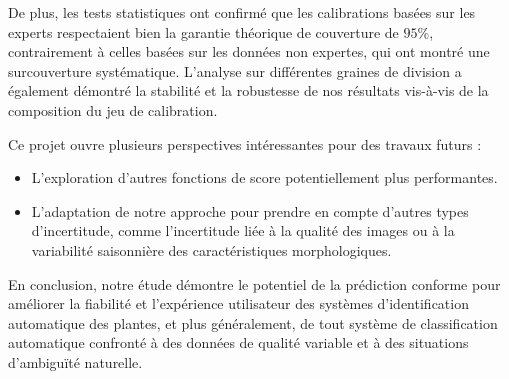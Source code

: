 \documentclass[a4paper,12pt]{article}
\begin{document}
\vspace{0.2cm}

De plus, les tests statistiques ont confirmé que les calibrations basées sur les experts respectaient bien la garantie théorique de couverture de $95\%$, contrairement à celles basées sur les données non expertes, qui ont montré une surcouverture systématique. L’analyse sur différentes graines de division a également démontré la stabilité et la robustesse de nos résultats vis-à-vis de la composition du jeu de calibration.

\vspace{0.2cm}

Ce projet ouvre plusieurs perspectives intéressantes pour des travaux futurs :

\begin{itemize}
    \item L'exploration d'autres fonctions de score potentiellement plus performantes.
    \item L'adaptation de notre approche pour prendre en compte d'autres types d'incertitude, comme l'incertitude liée à la qualité des images ou à la variabilité saisonnière des caractéristiques morphologiques.
\end{itemize}

\vspace{0.2cm}

En conclusion, notre étude démontre le potentiel de la prédiction conforme pour améliorer la fiabilité et l'expérience utilisateur des systèmes d'identification automatique des plantes, et plus généralement, de tout système de classification automatique confronté à des données de qualité variable et à des situations d'ambiguïté naturelle.

\printbibliography
\end{document}
